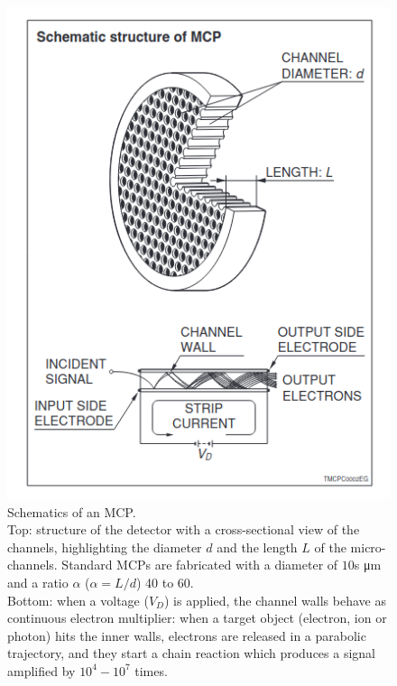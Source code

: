 \begin{figure}
\begin{minipage}[c]{.45\linewidth}
    \includegraphics[width=1\linewidth]{Images/TestBeam_setup/MCP diagram HAMAMATSU.png}
\end{minipage}
\hfill
\begin{minipage}[c]{.5\linewidth}
    \caption{
    Schematics of an MCP.\\ 
    Top: structure of the detector with a cross-sectional view of the channels, highlighting the diameter $d$ and the length $L$ of the micro-channels. Standard MCPs are fabricated with a diameter of $10$s \unit{\micro\meter} and a ratio $\alpha$ ($\alpha = L / d$) 40 to 60.\\
    Bottom: when a voltage ($V_D$) is applied, the channel walls behave as continuous electron multiplier: when a target object (electron, ion or photon) hits the inner walls, electrons are released in a parabolic trajectory, and they start a chain reaction which produces a signal amplified by $10^4-10^7$ times.}
\end{minipage}
\label{fig:MCP_diagrame}
\end{figure}


